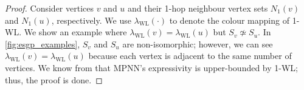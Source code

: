 \mpnnesgp*
\begin{proof}
Consider vertices $v$ and $u$ and their 1-hop neighbour vertex sets $N_1(v)$ and $N_1(u)$, respectively. We use $\lambda_{\text{WL}}(\cdot)$ to denote the colour mapping of 1-WL.
We show an example where $\lambda_{\text{WL}}(v) = \lambda_{\text{WL}}(u)$ but $S_v\not\simeq S_u$. In \cref{fig:esgp_examples}, $S_v$ and $S_u$ are non-isomorphic; however, we can see $\lambda_{\text{WL}}(v)=\lambda_{\text{WL}}(u)$ because each vertex is adjacent to the same number of vertices. We know from \citet{xu2018powerful} that MPNN's expressivity is upper-bounded by 1-WL; thus, the proof is done.
\end{proof}


